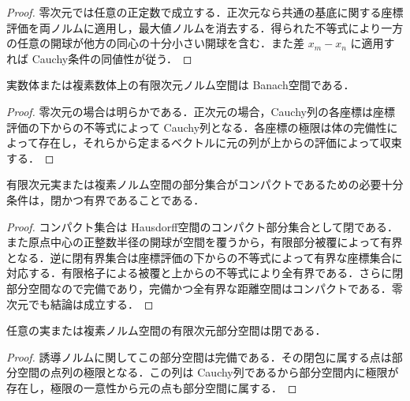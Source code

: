 \begin{proof}
零次元では任意の正定数で成立する．正次元なら共通の基底に関する座標評価を両ノルムに適用し，最大値ノルムを消去する．得られた不等式により一方の任意の開球が他方の同心の十分小さい開球を含む．また差 $x_m-x_n$ に適用すれば Cauchy条件の同値性が従う．
\end{proof}
\begin{prop}[有限次元ノルム空間の完備性]
実数体または複素数体上の有限次元ノルム空間は Banach空間である．
\end{prop}
\begin{proof}
零次元の場合は明らかである．正次元の場合，Cauchy列の各座標は座標評価の下からの不等式によって Cauchy列となる．各座標の極限は体の完備性によって存在し，それらから定まるベクトルに元の列が上からの評価によって収束する．
\end{proof}
\begin{prop}[有限次元ノルム空間のコンパクト集合]
有限次元実または複素ノルム空間の部分集合がコンパクトであるための必要十分条件は，閉かつ有界であることである．
\end{prop}
\begin{proof}
コンパクト集合は Hausdorff空間のコンパクト部分集合として閉である．また原点中心の正整数半径の開球が空間を覆うから，有限部分被覆によって有界となる．逆に閉有界集合は座標評価の下からの不等式によって有界な座標集合に対応する．有限格子による被覆と上からの不等式により全有界である．さらに閉部分空間なので完備であり，完備かつ全有界な距離空間はコンパクトである．零次元でも結論は成立する．
\end{proof}
\begin{prop}[有限次元部分空間の閉性]
任意の実または複素ノルム空間の有限次元部分空間は閉である．
\end{prop}
\begin{proof}
誘導ノルムに関してこの部分空間は完備である．その閉包に属する点は部分空間の点列の極限となる．この列は Cauchy列であるから部分空間内に極限が存在し，極限の一意性から元の点も部分空間に属する．
\end{proof}
